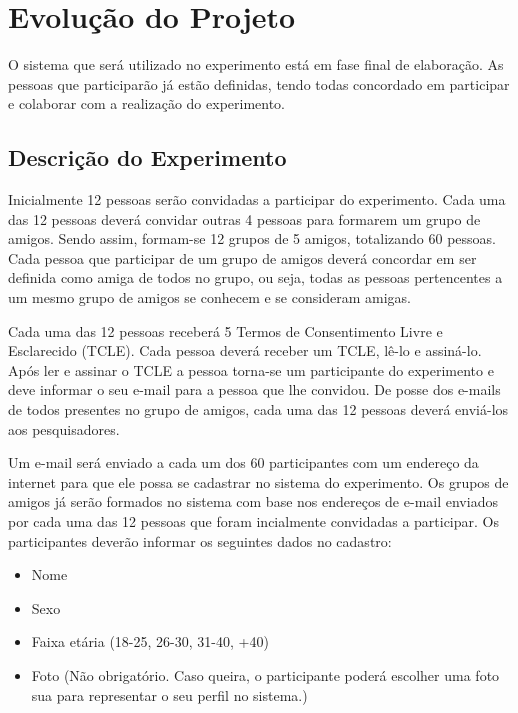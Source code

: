 \section{Evolução do Projeto}

 O sistema que será utilizado no experimento está em fase final de elaboração. As pessoas que participarão já estão definidas, tendo todas concordado em participar e colaborar com a realização do experimento.

\subsection{Descrição do Experimento}
\label{cha:descricao_do_experimento}

 Inicialmente 12 pessoas serão convidadas a participar do experimento. Cada uma das 12 pessoas deverá convidar outras 4 pessoas para formarem um grupo de amigos. Sendo assim, formam-se 12 grupos de 5 amigos, totalizando 60 pessoas. Cada pessoa que participar de um grupo de amigos deverá concordar em ser definida como amiga de todos no grupo, ou seja, todas as pessoas pertencentes a um mesmo grupo de amigos se conhecem e se consideram amigas.

 Cada uma das 12 pessoas receberá 5 Termos de Consentimento Livre e Esclarecido (TCLE). Cada pessoa deverá receber um TCLE, lê-lo e assiná-lo. Após ler e assinar o TCLE a pessoa torna-se um participante do experimento e deve informar o seu e-mail para a pessoa que lhe convidou. De posse dos e-mails de todos presentes no grupo de amigos, cada uma das 12 pessoas deverá enviá-los aos pesquisadores.

 Um e-mail será enviado a cada um dos 60 participantes com um endereço da internet para que ele possa se cadastrar no sistema do experimento. Os grupos de amigos já serão formados no sistema com base nos endereços de e-mail enviados por cada uma das 12 pessoas que foram incialmente convidadas a participar. Os participantes deverão informar os seguintes dados no cadastro:

\begin{itemize}
	\item Nome
	\item Sexo
	\item Faixa etária (18-25, 26-30, 31-40, +40)
	\item Foto (Não obrigatório. Caso queira, o participante poderá escolher uma foto sua para representar o seu perfil no sistema.)
\end{itemize}

